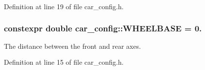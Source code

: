 Definition at line 19 of file car\+\_\+config.\+h.

\subsubsection[{\texorpdfstring{W\+H\+E\+E\+L\+B\+A\+SE}{WHEELBASE}}]{\setlength{\rightskip}{0pt plus 5cm}constexpr double car\+\_\+config\+::\+W\+H\+E\+E\+L\+B\+A\+SE = 0.}\hypertarget{namespacecar__config_a4e9e4925d43a88de91b13bedafabce67}{}\label{namespacecar__config_a4e9e4925d43a88de91b13bedafabce67}


The distance between the front and rear axes. 



Definition at line 15 of file car\+\_\+config.\+h.

